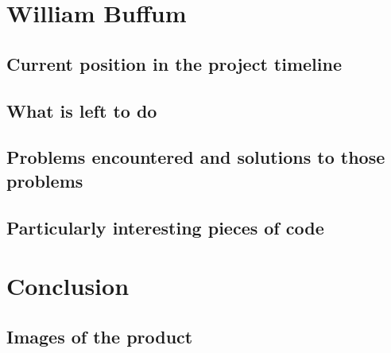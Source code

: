\documentclass[draftclsnofoot,onecolumn,letterpaper,10pt,compsoc]{IEEEtran}
\begin{document}
\section{William Buffum}
\subsection{Current position in the project timeline}
\subsection{What is left to do}
\subsection{Problems encountered and solutions to those problems}
\subsection{Particularly interesting pieces of code}

\section{Conclusion}

\subsection{Images of the product}
\end{document}
